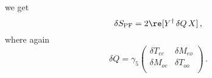 we get
\begin{equation}
  \label{eq:swdS}
  \delta S_\mathrm{PF} = 2 \re[Y^\dagger\, \delta Q\, X]\,,
\end{equation}
where again
\[
\delta Q = \gamma_5
\begin{pmatrix}
  \delta T_{ee} & \delta M_{eo}\\
  \delta M_{oe} & \delta T_{oo}\\
\end{pmatrix}\,.
\]

